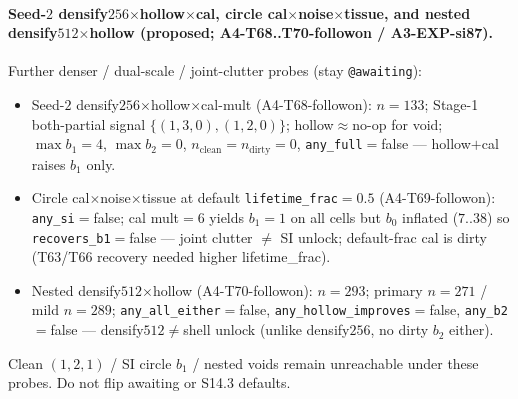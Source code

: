 \documentclass[11pt]{article}
\begin{document}
\paragraph{Seed-$2$ densify$256$$\times$hollow$\times$cal, circle
cal$\times$noise$\times$tissue, and nested densify$512$$\times$hollow
(proposed; A4-T68..T70-followon / A3-EXP-si87).}
Further denser / dual-scale / joint-clutter probes (stay
\texttt{@awaiting}):
\begin{itemize}[leftmargin=1.5em]
  \item Seed-$2$ densify$256$$\times$hollow$\times$cal-mult
  (A4-T68-followon): $n{=}133$; Stage-1 both-partial signal
  $\{(1,3,0),(1,2,0)\}$; hollow$\approx$no-op for void;
  $\max b_1{=}4$, $\max b_2{=}0$,
  $n_{\mathrm{clean}}{=}n_{\mathrm{dirty}}{=}0$,
  \texttt{any\_full}${=}$false --- hollow$+$cal raises $b_1$ only.
  \item Circle cal$\times$noise$\times$tissue at default
  \texttt{lifetime\_frac}${=}0.5$ (A4-T69-followon):
  \texttt{any\_si}${=}$false; cal mult${=}6$ yields $b_1{=}1$ on all
  cells but $b_0$ inflated ($7..38$) so \texttt{recovers\_b1}${=}$false
  --- joint clutter $\neq$ SI unlock; default-frac cal is dirty (T63/T66
  recovery needed higher lifetime\_frac).
  \item Nested densify$512$$\times$hollow (A4-T70-followon): $n{=}293$;
  primary $n{=}271$ / mild $n{=}289$;
  \texttt{any\_all\_either}${=}$false,
  \texttt{any\_hollow\_improves}${=}$false, \texttt{any\_b2}${=}$false
  --- densify$512$$\neq$shell unlock (unlike densify$256$, no dirty
  $b_2$ either).
\end{itemize}
Clean $(1,2,1)$ / SI circle $b_1$ / nested voids remain unreachable under
these probes. Do not flip awaiting or S14.3 defaults.
\end{document}
